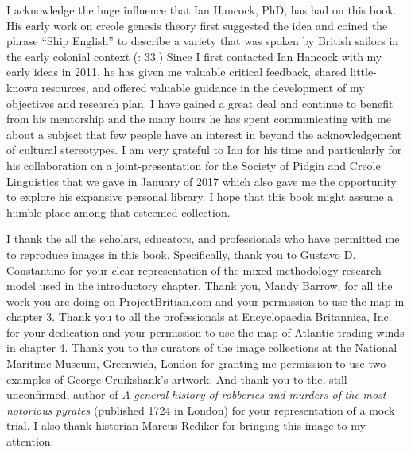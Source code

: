 I acknowledge the huge influence that Ian Hancock, PhD, has had on this book. His early work on creole genesis theory first suggested the idea and coined the phrase “Ship English” to describe a variety that was spoken by British sailors in the early colonial context (\citealt{Hancock1976}: 33.) Since I first contacted Ian Hancock with my early ideas in 2011, he has given me valuable critical feedback, shared little-known resources, and offered valuable guidance in the development of my objectives and research plan. I have gained a great deal and continue to benefit from his mentorship and the many hours he has spent communicating with me about a subject that few people have an interest in beyond the acknowledgement of cultural stereotypes. I am very grateful to Ian for his time and particularly for his collaboration on a joint-presentation for the Society of Pidgin and Creole Linguistics that we gave in January of 2017 which also gave me the opportunity to explore his expansive personal library. I hope that this book might assume a humble place among that esteemed collection. 

I thank the all the scholars, educators, and professionals who have permitted me to reproduce images in this book. Specifically, thank you to Gustavo D. Constantino for your clear representation of the mixed methodology research model used in the introductory chapter. Thank you, Mandy Barrow, for all the work you are doing on ProjectBritian.com and your permission to use the map in chapter 3. Thank you to all the professionals at Encyclopaedia Britannica, Inc. for your dedication and your permission to use the map of Atlantic trading winds in chapter 4. Thank you to the curators of the image collections at the National Maritime Museum, Greenwich, London for granting me permission to use two examples of George Cruikshank’s artwork. And thank you to the, still unconfirmed, author of \textit{A} \textit{general} \textit{history} \textit{of} \textit{robberies} \textit{and} \textit{murders} \textit{of} \textit{the} \textit{most} \textit{notorious} \textit{pyrates} (published 1724 in London) for your representation of a mock trial. I also thank historian Marcus Rediker for bringing this image to my attention. 

